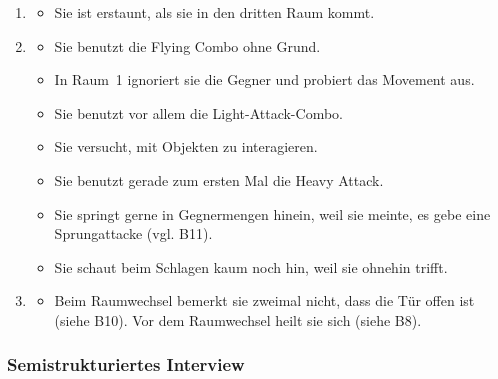 \documentclass[../Main.tex]{subfiles}
\begin{document}
\begin{enumerate}[label=\textbf{B\arabic*}, leftmargin=1.5cm, itemsep=0.8em, resume]
\begin{itemize}[nosep]
\item Sie findet die Ästhetik schön.
\item Sie wünscht sich einen Block.
\item Sie findet das Movement richtig cool und meint, es habe eine Lernkurve.
\item Sie findet die Animationen des Heavy Soldiers und des Chain Archers cool.
\end{itemize}
\item
\begin{itemize}[nosep]
\item Sie ist erstaunt, als sie in den dritten Raum kommt.
\end{itemize}
\item
\begin{itemize}[nosep]
\item Sie benutzt die Flying Combo ohne Grund.
\item In Raum~1 ignoriert sie die Gegner und probiert das Movement aus.
\item Sie benutzt vor allem die Light-Attack-Combo.
\item Sie versucht, mit Objekten zu interagieren.
\item Sie benutzt gerade zum ersten Mal die Heavy Attack.
\item Sie springt gerne in Gegnermengen hinein, weil sie meinte, es gebe eine Sprungattacke (vgl. B11).
\item Sie schaut beim Schlagen kaum noch hin, weil sie ohnehin trifft.
\end{itemize}
\item
\begin{itemize}[nosep]
\item Beim Raumwechsel bemerkt sie zweimal nicht, dass die Tür offen ist (siehe B10). Vor dem Raumwechsel heilt sie sich (siehe B8).
\end{itemize}
\end{enumerate}

\subsubsection{Semistrukturiertes Interview}
\end{document}
